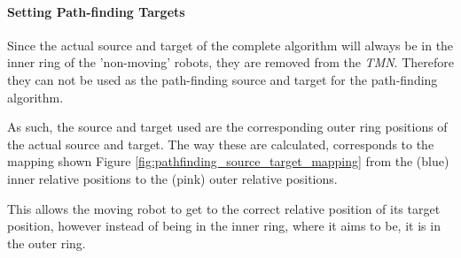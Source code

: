 \paragraph{Setting Path-finding Targets}
\label{section:pathfinding_targets}

Since the actual source and target of the complete algorithm will always be in the inner ring of the 'non-moving' robots, they are removed from the \textit{TMN}.  Therefore they can not be used as the path-finding source and target for the path-finding algorithm. 

As such, the source and target used are the corresponding outer ring positions of the actual source and target. The way these are calculated, corresponds to the mapping shown Figure \ref{fig:pathfinding_source_target_mapping} from the (blue) inner relative positions to the (pink) outer relative positions.

This allows the moving robot to get to the correct relative position of its target position, however instead of being in the inner ring, where it aims to be, it is in the outer ring.

